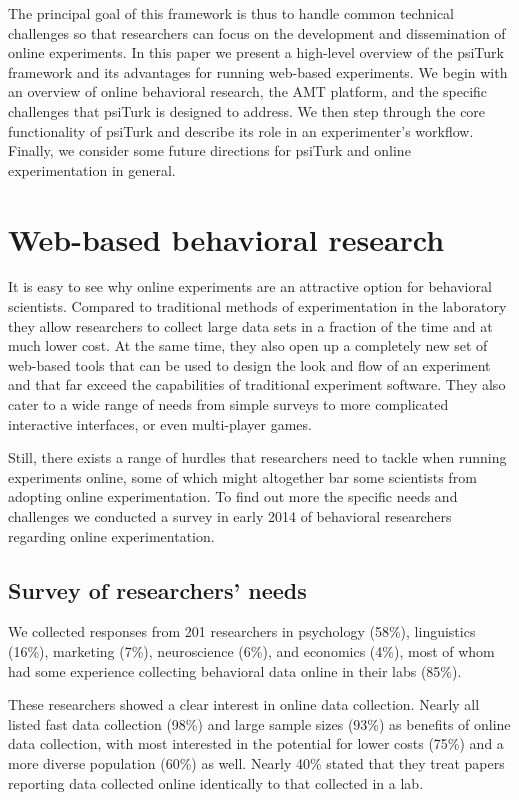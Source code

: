 \documentclass[twocolumn]{svjour3}          %
\begin{document}
The principal goal of this framework is thus to handle common technical challenges so that researchers can focus on the development and dissemination of online experiments.
In this paper we present a high-level overview of the psiTurk framework and its advantages for running web-based experiments.
We begin with an overview of online behavioral research, the AMT platform, and the specific challenges that psiTurk is designed to address.
We then step through the core functionality of psiTurk and describe its role in an experimenter's workflow.
Finally, we consider some future directions for psiTurk and online experimentation in general.


\section{Web-based behavioral research}
It is easy to see why online experiments are an attractive option for behavioral scientists.
Compared to traditional methods of experimentation in the laboratory
they allow researchers to collect large data sets in a fraction of the time and at much lower cost.
At the same time, they also open up a completely new set of web-based tools that  can be used to
design the look and flow of an experiment and that far exceed the capabilities
of traditional experiment software.
They also cater to a wide range of needs from simple surveys to more complicated interactive interfaces,
 or even multi-player games.

Still, there exists a range of hurdles that researchers need to tackle when running experiments
online, some of which might altogether bar some scientists from adopting online experimentation.
 To find out more the specific needs and challenges we conducted a survey in early 2014 of behavioral 
 researchers regarding online experimentation. 

\subsection{Survey of researchers' needs}
 We collected responses from 201 researchers in psychology (58\%),
linguistics (16\%), marketing (7\%), neuroscience (6\%), and economics (4\%), most of whom had some
experience collecting behavioral data online in their labs (85\%).

These researchers showed a clear interest in online data collection. Nearly all listed fast data
collection (98\%) and large sample sizes (93\%) as benefits of online data collection, with most
interested in the potential for lower costs (75\%) and a more diverse population (60\%) as well. Nearly
40\% stated that they treat papers reporting data collected online identically to that collected in
a lab.
\end{document}
